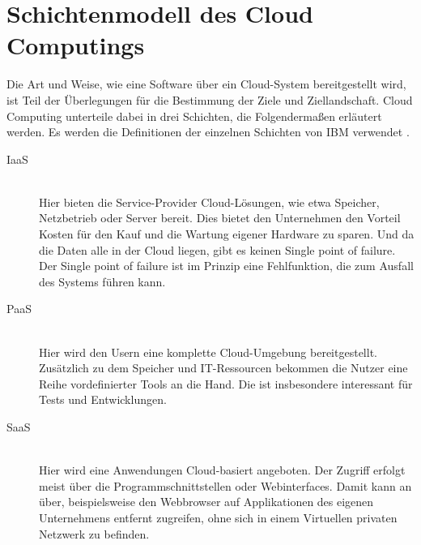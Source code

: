 \section{Schichtenmodell des Cloud Computings}
\label{VgmAsAService}

Die Art und Weise, wie eine Software über ein Cloud-System bereitgestellt wird, ist Teil der Überlegungen für die Bestimmung der Ziele und Ziellandschaft. Cloud Computing unterteile dabei in drei Schichten, die Folgendermaßen erläutert werden. Es werden die Definitionen der einzelnen Schichten von IBM verwendet \cite{ibmAsAStructre}.

\begin{description}   
 \item [\acl{IaaS}] \hfill \\
 Hier bieten die Service-Provider Cloud-Lösungen, wie etwa Speicher, Netzbetrieb oder Server bereit. Dies bietet den Unternehmen den Vorteil Kosten für den Kauf und die Wartung eigener Hardware zu sparen. Und da die Daten alle in der Cloud liegen, gibt es keinen Single point of failure. Der Single point of failure ist im Prinzip eine Fehlfunktion, die zum Ausfall des Systems führen kann. 
 \item [\acl{PaaS}]\hfill \\
 Hier wird den Usern eine komplette Cloud-Umgebung bereitgestellt. Zusätzlich zu dem Speicher und IT-Ressourcen bekommen die Nutzer eine Reihe vordefinierter Tools an die Hand. Die ist insbesondere interessant für Tests und Entwicklungen.
 \item [\acl{SaaS}] \hfill \\
Hier wird eine Anwendungen Cloud-basiert angeboten. Der Zugriff erfolgt meist über die Programmschnittstellen oder Webinterfaces. Damit kann an über, beispielsweise den Webbrowser auf Applikationen des eigenen Unternehmens entfernt zugreifen, ohne sich in einem Virtuellen privaten Netzwerk zu befinden.
 \end{description}